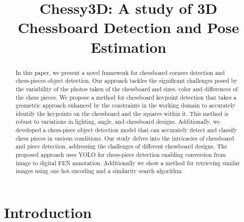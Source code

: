 \documentclass[conference]{IEEEtran}
\begin{document}
\title{Chessy3D: A study of 3D Chessboard Detection and Pose Estimation\\}

\author{
\and
\and
}

\maketitle

\begin{abstract}
In this paper, we present a novel framework for chessboard corners detection and chess-pieces object detection. 
Our approach tackles the significant challenges posed by the variability of the photos taken of the chessboard and sizes, 
color and differences of the chess pieces.
We propose a method for chessboard keypoint detection that takes a geometric approach enhanced by the constraints 
in the working domain to accurately identify the keypoints on the chessboard and the squares within it.
This method is robust to variations in lighting, angle, and chessboard designs.
Additionally, we developed a chess-piece object detection model that can accurately detect and classify chess pieces in various conditions.
Our study delves into the intricacies of chessboard and piece detection, addressing the challenges of different chessboard designs.
The proposed approach uses YOLO for chess-piece detection enabling conversion from image to digital FEN annotation.
Additionally we show a method for retrieving similar images using one hot encoding and a similarity search algorithm.
\end{abstract}

\section{Introduction}

\end{document}
